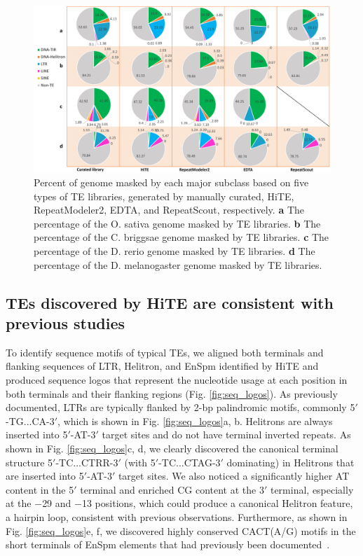 \documentclass{bmcart}
\begin{document}
\begin{figure}[h!]
	\centerline{\includegraphics[width=1.0\textwidth]{figures/RatioResults.pdf}}
	\caption{Percent of genome masked by each major subclass based on five types of TE libraries, generated by manually curated, HiTE, RepeatModeler2, EDTA, and RepeatScout, respectively. \textbf{a} The percentage of the O. sativa genome masked by TE libraries. \textbf{b} The percentage of the C. briggsae genome masked by TE libraries. \textbf{c} The percentage of the D. rerio genome masked by TE libraries. \textbf{d} The percentage of the D. melanogaster genome masked by TE libraries. }
	\label{fig:ratio_results}
\end{figure}

\subsection*{TEs discovered by HiTE are consistent with previous studies}
To identify sequence motifs of typical TEs, we aligned both terminals and flanking sequences of LTR, Helitron, and EnSpm identified by HiTE and produced sequence logos that represent the nucleotide usage at each position in both terminals and their flanking regions (Fig. \ref{fig:seq_logos}). As previously documented\cite{zhou2021comprehensive}, LTRs are typically flanked by 2-bp palindromic motifs, commonly 5$'$-TG...CA-3$'$, which is shown in Fig. \ref{fig:seq_logos}a, b. Helitrons are always inserted into 5$'$-AT-3$'$ target sites and do not have terminal inverted repeats. As shown in Fig. \ref{fig:seq_logos}c, d, we clearly discovered the canonical terminal structure 5$'$-TC...CTRR-3$'$ (with 5$'$-TC...CTAG-3$'$ dominating) in Helitrons that are inserted into 5$'$-AT-3$'$ target sites. We also noticed a significantly higher AT content in the 5$'$ terminal and enriched CG content at the 3$'$ terminal, especially at the $-$29 and $-$13 positions, which could produce a canonical Helitron feature, a hairpin loop, consistent with previous observations\cite{yang2009structure, xiong2014helitronscanner}. Furthermore, as shown in Fig. \ref{fig:seq_logos}e, f, we discovered highly conserved CACT(A/G) motifs in the short terminals of EnSpm elements that had previously been documented \cite{wicker2007unified, demarco2006smtrc1}. 
\end{document}
